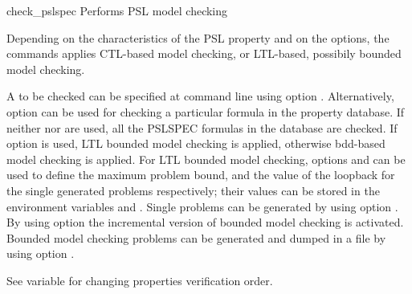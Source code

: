 \begin{nusmvCommand}{check\_pslspec} {Performs PSL model checking}


Depending on the characteristics of the PSL property and on the
options, the commands applies CTL-based model checking, or LTL-based,
possibily bounded model checking.

A \pslexpr to be checked can be specified at command line using option
. Alternatively, option  can be used for
checking a particular formula in the property database. If neither
 nor  are used, all the PSLSPEC formulas
in the database are checked. If option  is used, LTL
bounded model checking is applied, otherwise bdd-based model checking
is applied. For LTL bounded model checking, options  and
 can be used to define the maximum problem bound, and
the value of the loopback for the single generated problems
respectively; their values can be stored in the environment variables
 and . Single
problems can be generated by using option . By using
option  the incremental version of bounded model
checking is activated. Bounded model checking problems can be
generated and dumped in a file by using option .

See variable  for changing properties
verification order.

\begin{cmdOpt}




\end{cmdOpt}
\end{nusmvCommand}
